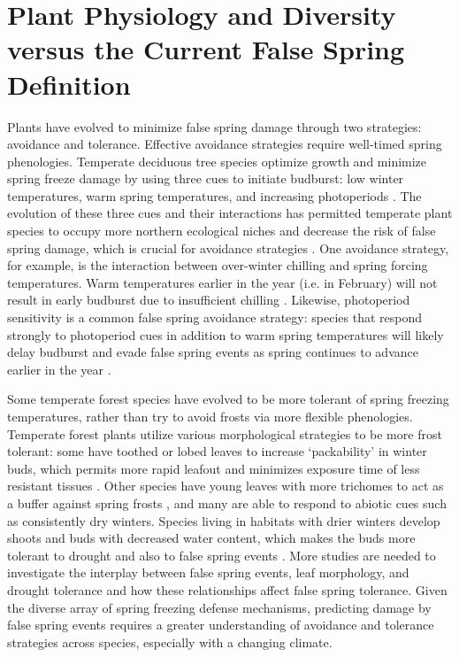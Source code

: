 \documentclass{article}\usepackage[]{graphicx}\usepackage[]{color}
\begin{document}
\section {Plant Physiology and Diversity versus the Current False Spring Definition}
Plants have evolved to minimize false spring damage through two strategies: avoidance and tolerance. Effective avoidance strategies require well-timed spring phenologies. Temperate deciduous tree species optimize growth and minimize spring freeze damage by using three cues to initiate budburst: low winter temperatures, warm spring temperatures, and increasing photoperiods \citep{Chuine2010}. The evolution of these three cues and their interactions has permitted temperate plant species to occupy more northern ecological niches and decrease the risk of false spring damage, which is crucial for avoidance strategies \citep{Samish1954}. One avoidance strategy, for example, is the interaction between over-winter chilling and spring forcing temperatures. Warm temperatures earlier in the year (i.e. in February) will not result in early budburst due to insufficient chilling \citep{Basler2012}. Likewise, photoperiod sensitivity is a common false spring avoidance strategy: species that respond strongly to photoperiod cues in addition to warm spring temperatures will likely delay budburst and evade false spring events as spring continues to advance earlier in the year \citep{Basler2014}. 

Some temperate forest species have evolved to be more tolerant of spring freezing temperatures, rather than try to avoid frosts via more flexible phenologies. Temperate forest plants utilize various morphological strategies to be more frost tolerant: some have toothed or lobed leaves to increase `packability' in winter buds, which permits more rapid leafout and minimizes exposure time of less resistant tissues \citep{Edwards2017}. Other species have young leaves with more trichomes to act as a buffer against spring frosts \citep{Agrawal2004, Prozherina2003}, and many are able to respond to abiotic cues such as consistently dry winters. Species living in habitats with drier winters develop shoots and buds with decreased water content, which makes the buds more tolerant to drought and also to false spring events \citep{Beck2007, Morin2007, Nielsen2009, Poirier2010, Kathke2011, Hofmann2015}. More studies are needed to investigate the interplay between false spring events, leaf morphology, and drought tolerance and how these relationships affect false spring tolerance. Given the diverse array of spring freezing defense mechanisms, predicting damage by false spring events requires a greater understanding of avoidance and tolerance strategies across species, especially with a changing climate.
\end{document}
